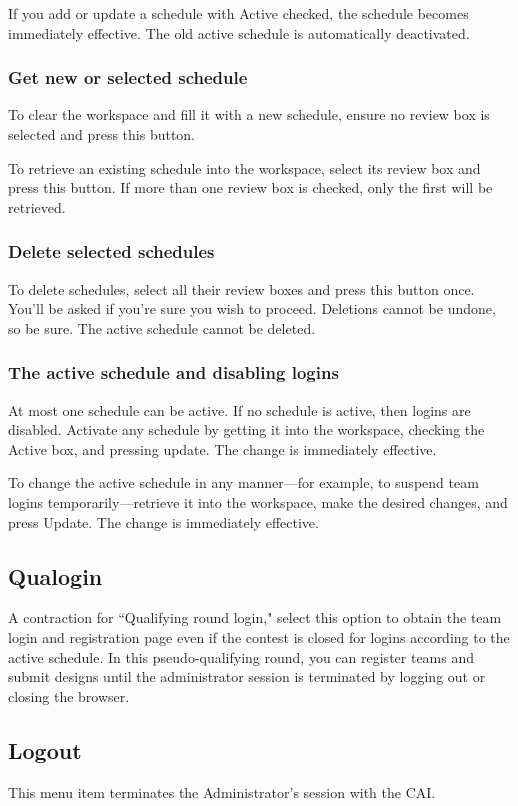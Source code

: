 \documentclass[11pt,letterpaper]{refart}
\def\ui#1{\textsf{#1}}
\begin{document}
If you add or update a schedule with \ui{Active} checked, the schedule becomes
immediately effective. The old active schedule is automatically deactivated.

\subsubsection{Get new or selected schedule}
To clear the workspace and fill it with a new schedule, ensure no 
review box is selected and press this button.

To retrieve an existing schedule into the workspace, select 
its review box and press this button. If more than one review box is
checked, only the first will be retrieved. 

\subsubsection{Delete selected schedules}
To delete schedules, select all their review boxes and press this button
once. You'll be asked if you're sure you wish to proceed. Deletions cannot
be undone, so be sure. The active schedule cannot be deleted.

\subsubsection{The active schedule and disabling logins}
At most one schedule can be active. If no schedule is active, then logins are disabled.
Activate any schedule by getting it into the workspace, checking the \ui{Active} box,
and pressing \ui{update}. The change is immediately effective.

To change the active schedule in any manner---for example, to suspend team logins
temporarily---retrieve it into the workspace, make the desired changes, and press
\ui{Update}. The change is immediately effective.

\subsection{Qualogin}
A contraction for ``Qualifying round login," select this option to obtain the
team login and registration page even if the contest is closed for logins 
according to the active schedule. In this pseudo-qualifying round, you can 
register teams and submit designs until the administrator session is 
terminated by logging out or closing the browser.

\subsection{Logout}
This menu item terminates the Administrator's session with the CAI.
\end{document}

